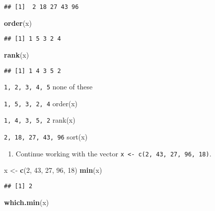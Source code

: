 \documentclass[
]{article}
\newenvironment{Shaded}{\begin{snugshade}}{\end{snugshade}}
\newcommand{\DecValTok}[1]{\textcolor[rgb]{0.00,0.00,0.81}{#1}}
\newcommand{\KeywordTok}[1]{\textcolor[rgb]{0.13,0.29,0.53}{\textbf{#1}}}
\newcommand{\NormalTok}[1]{#1}
\newcommand{\StringTok}[1]{\textcolor[rgb]{0.31,0.60,0.02}{#1}}
\providecommand{\tightlist}{%
  \setlength{\itemsep}{0pt}\setlength{\parskip}{0pt}}
\begin{document}
\begin{verbatim}
## [1]  2 18 27 43 96
\end{verbatim}

\begin{Shaded}
\begin{Highlighting}[]
\KeywordTok{order}\NormalTok{(x)}
\end{Highlighting}
\end{Shaded}

\begin{verbatim}
## [1] 1 5 3 2 4
\end{verbatim}

\begin{Shaded}
\begin{Highlighting}[]
\KeywordTok{rank}\NormalTok{(x)}
\end{Highlighting}
\end{Shaded}

\begin{verbatim}
## [1] 1 4 3 5 2
\end{verbatim}

\texttt{1,\ 2,\ 3,\ 4,\ 5} none of these

\texttt{1,\ 5,\ 3,\ 2,\ 4} order(x)

\texttt{1,\ 4,\ 3,\ 5,\ 2} rank(x)

\texttt{2,\ 18,\ 27,\ 43,\ 96} sort(x)

\begin{enumerate}
\def\labelenumi{\arabic{enumi}.}
\setcounter{enumi}{1}
\tightlist
\item
  Continue working with the vector
  \texttt{x\ \textless{}-\ c(2,\ 43,\ 27,\ 96,\ 18)}.
\end{enumerate}

\begin{Shaded}
\begin{Highlighting}[]
\NormalTok{x <-}\StringTok{ }\KeywordTok{c}\NormalTok{(}\DecValTok{2}\NormalTok{, }\DecValTok{43}\NormalTok{, }\DecValTok{27}\NormalTok{, }\DecValTok{96}\NormalTok{, }\DecValTok{18}\NormalTok{)}
\KeywordTok{min}\NormalTok{(x)}
\end{Highlighting}
\end{Shaded}

\begin{verbatim}
## [1] 2
\end{verbatim}

\begin{Shaded}
\begin{Highlighting}[]
\KeywordTok{which.min}\NormalTok{(x)}
\end{Highlighting}
\end{Shaded}
\end{document}
